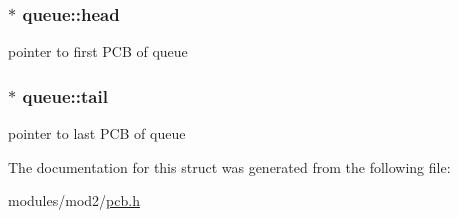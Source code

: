 \subsubsection[{head}]{$\ast$ queue\+::head}\label{structqueue_ac401d88465246ee4d9d6c560b609a644}


pointer to first P\+C\+B of queue 

\hypertarget{structqueue_a53dc6dcbe28083b4137ac4c5f3f07f46}{}
\subsubsection[{tail}]{$\ast$ queue\+::tail}\label{structqueue_a53dc6dcbe28083b4137ac4c5f3f07f46}


pointer to last P\+C\+B of queue 



The documentation for this struct was generated from the following file\+:\begin{DoxyCompactItemize}
\item 
modules/mod2/\hyperlink{pcb_8h}{pcb.\+h}\end{DoxyCompactItemize}
